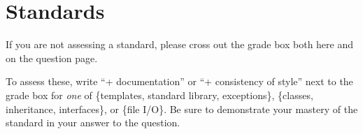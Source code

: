 




\docCopyright

\section*{Standards}
If you are not assessing a standard, please cross out the grade box both here
and on the question page.
\par\vspace{0.4in}
\begin{minipage}[t]{0.33\linewidth}
\end{minipage}
\begin{minipage}[t]{0.67\linewidth} \vspace{-1.8ex}
  To assess these, write ``+ documentation'' or ``+ consistency of style'' next
  to the grade box for \textit{one} of
  {\color{gray}\{}templates, standard library, exceptions{\color{gray}\}},
  {\color{gray}\{}classes, inheritance, interfaces{\color{gray}\}}, or
  {\color{gray}\{}file I/O{\color{gray}\}}.
  Be sure to demonstrate your mastery of the standard in your answer to the
  question.
\end{minipage}
\par\vspace{0.45in}
\begin{minipage}[t]{1\linewidth}
\end{minipage}
\par\vspace{0.45in}
\begin{minipage}[t]{0.6\linewidth}
\end{minipage}
\begin{minipage}[t]{0.4\linewidth}
\end{minipage}
\newpage

